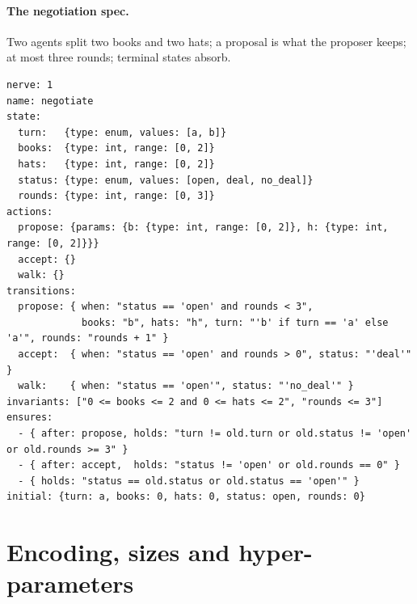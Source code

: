 \paragraph{The negotiation spec.} Two agents split two books and two hats; a proposal is what the proposer keeps; at most three rounds; terminal states absorb.
\begin{lstlisting}
nerve: 1
name: negotiate
state:
  turn:   {type: enum, values: [a, b]}
  books:  {type: int, range: [0, 2]}
  hats:   {type: int, range: [0, 2]}
  status: {type: enum, values: [open, deal, no_deal]}
  rounds: {type: int, range: [0, 3]}
actions:
  propose: {params: {b: {type: int, range: [0, 2]}, h: {type: int, range: [0, 2]}}}
  accept: {}
  walk: {}
transitions:
  propose: { when: "status == 'open' and rounds < 3",
             books: "b", hats: "h", turn: "'b' if turn == 'a' else 'a'", rounds: "rounds + 1" }
  accept:  { when: "status == 'open' and rounds > 0", status: "'deal'" }
  walk:    { when: "status == 'open'", status: "'no_deal'" }
invariants: ["0 <= books <= 2 and 0 <= hats <= 2", "rounds <= 3"]
ensures:
  - { after: propose, holds: "turn != old.turn or old.status != 'open' or old.rounds >= 3" }
  - { after: accept,  holds: "status != 'open' or old.rounds == 0" }
  - { holds: "status == old.status or old.status == 'open'" }
initial: {turn: a, books: 0, hats: 0, status: open, rounds: 0}
\end{lstlisting}

\section{Encoding, sizes and hyper-parameters}
\label{app:details}


